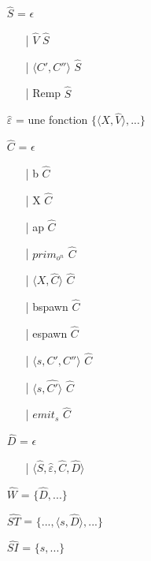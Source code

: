 \documentclass[10pt,a4paper]{article}
\begin{document}
					
					\begin{itemize}
						\item[] $\widehat{S}$ = $\epsilon$ 
						\begin{itemize}
							\item[|] $\widehat{V}$ $\widehat{S}$ 
							\item[|] $\langle C',C''\rangle$ $\widehat{S}$
							\item[|] Remp $\widehat{S}$
						\end{itemize}
						\item[] $\widehat{\varepsilon}$ = une fonction $\{\langle X,\widehat{V}\rangle,...\}$
						\item[] $\widehat{C}$ = $\epsilon$ 
						\begin{itemize}
							\item[|] b $\widehat{C}$
							\item[|] X $\widehat{C}$
							\item[|] ap $\widehat{C}$
							\item[|] $prim_{o^{n}}$ $\widehat{C}$  
							\item[|] $\langle X,\widehat{C}\rangle$ $\widehat{C}$
							\item[|] bspawn $\widehat{C}$ 
							\item[|] espawn $\widehat{C}$
							\item[|] $\langle s,C',C''\rangle$ $\widehat{C}$
							\item[|] $\langle s,\widehat{C'}\rangle$ $\widehat{C}$ 
							\item[|] $emit_{s}$ $\widehat{C}$ 
						\end{itemize}
						\item[] $\widehat{D}$ =  $\epsilon$
						\begin{itemize}
							\item[|] $\langle\widehat{S},\widehat{\varepsilon},\widehat{C},\widehat{D}\rangle$ 
						\end{itemize}
						\item[] $\widehat{W}$ = $\{\widehat{D},...\}$
						\item[] $\widehat{ST}$ = $\{...,\langle s,\widehat{D}\rangle,...\}$
						\item[] $\widehat{SI}$ = $\{ s,...\}$
					\end{itemize}
					\bigbreak
					\bigbreak
					
\end{document}
